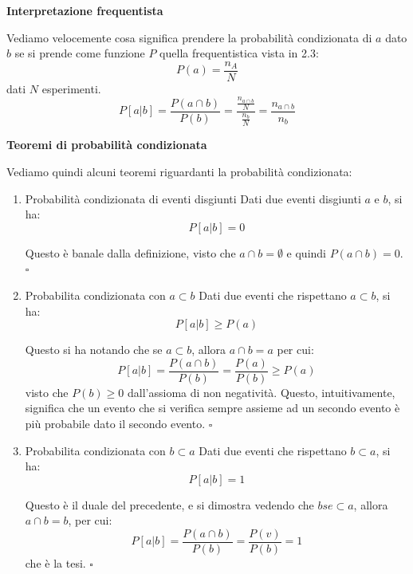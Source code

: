 \documentclass[a4paper,11pt]{article}
\begin{document}
\par\smallskip

\noindent
\textbf{\textsf{Interpretazione frequentista}}

\noindent
Vediamo velocemente cosa significa prendere la probabilità condizionata di $a$ dato $b$ se si prende come funzione $P$ quella frequentistica vista in 2.3:
$$
P(a) = \frac{n_A}{N}
$$
dati $N$ esperimenti.
$$
P[a | b] = \frac{P(a \cap b)}{P(b)} = \frac{ \frac{n_{a \cap b}}{N} }{ \frac{n_b}{N} } = \frac{n_{a \cap b}}{n_b}
$$


\par\smallskip

\newpage

\noindent
\textbf{\textsf{Teoremi di probabilità condizionata}}

\noindent
Vediamo quindi alcuni teoremi riguardanti la probabilità condizionata:
\begin{enumerate}
\item \begin{theorem}{Probabilità condizionata di eventi disgiunti}
	Dati due eventi disgiunti $a$ e $b$, si ha:
	$$
	P[a | b] = 0
	$$
\end{theorem}
Questo è banale dalla definizione, visto che $a \cap b = \emptyset$ e quindi $P(a \cap b) = 0$. \hfill $\square$

\item \begin{theorem}{Probabilita condizionata con $a \subset b$}
	Dati due eventi che rispettano $a \subset b$, si ha:
	$$
	P[a | b] \geq P(a)
	$$
\end{theorem}
Questo si ha notando che se $a \subset b$, allora $a \cap b = a$ per cui:
$$
P[a | b] = \frac{P(a \cap b)}{P(b)} = \frac{P(a)}{P(b)} \geq P(a)
$$
visto che $P(b) \geq 0$ dall'assioma di non negatività. Questo, intuitivamente, significa che un evento che si verifica sempre assieme ad un secondo evento è più probabile dato il secondo evento. \hfill $\square$


\item \begin{theorem}{Probabilita condizionata con $b \subset a$}
	Dati due eventi che rispettano $b \subset a$, si ha:
	$$
	P[a | b] = 1 
	$$
\end{theorem}
Questo è il duale del precedente, e si dimostra vedendo che $b se \subset a$, allora $a \cap b = b$, per cui:
$$
P[a | b] = \frac{P(a \cap b)}{P(b)} = \frac{P(v)}{P(b)} = 1
$$
che è la tesi. \hfill $\square$

\end{enumerate}
\end{document}
